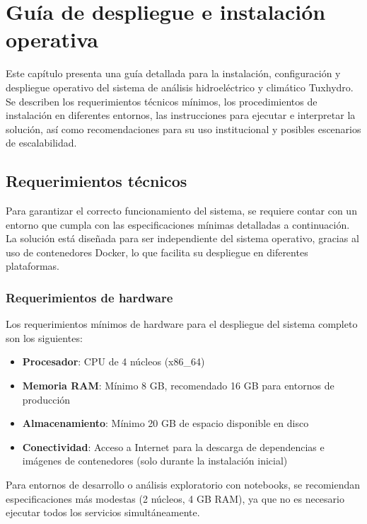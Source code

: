 \chapter{Guía de despliegue e instalación operativa}
\label{chp:7}

Este capítulo presenta una guía detallada para la instalación, configuración y despliegue operativo del sistema de análisis hidroeléctrico y climático Tuxhydro. Se describen los requerimientos técnicos mínimos, los procedimientos de instalación en diferentes entornos, las instrucciones para ejecutar e interpretar la solución, así como recomendaciones para su uso institucional y posibles escenarios de escalabilidad.

\section{Requerimientos técnicos}
\label{sec:chp7-1}

Para garantizar el correcto funcionamiento del sistema, se requiere contar con un entorno que cumpla con las especificaciones mínimas detalladas a continuación. La solución está diseñada para ser independiente del sistema operativo, gracias al uso de contenedores Docker, lo que facilita su despliegue en diferentes plataformas.

\subsection{Requerimientos de hardware}
\label{subsec:chp7-1-1}

Los requerimientos mínimos de hardware para el despliegue del sistema completo son los siguientes:

\begin{itemize}
    \item \textbf{Procesador}: CPU de 4 núcleos (x86\_64)
    \item \textbf{Memoria RAM}: Mínimo 8 GB, recomendado 16 GB para entornos de producción
    \item \textbf{Almacenamiento}: Mínimo 20 GB de espacio disponible en disco
    \item \textbf{Conectividad}: Acceso a Internet para la descarga de dependencias e imágenes de contenedores (solo durante la instalación inicial)
\end{itemize}

Para entornos de desarrollo o análisis exploratorio con notebooks, se recomiendan especificaciones más modestas (2 núcleos, 4 GB RAM), ya que no es necesario ejecutar todos los servicios simultáneamente.

